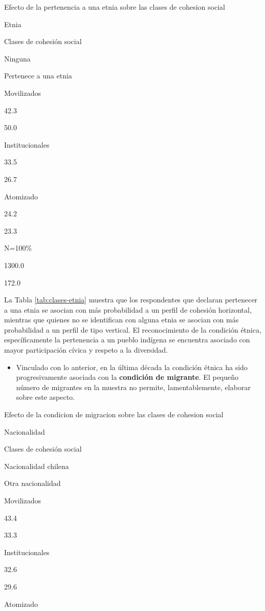 \documentclass[
  12pt,
]{book}
\providecommand{\tightlist}{%
  \setlength{\itemsep}{0pt}\setlength{\parskip}{0pt}}
\begin{document}
\label{tab:clases-etnia}Efecto de la pertenencia a una etnia sobre las clases de cohesion social

Etnia

Clases de cohesión social

Ninguna

Pertenece a una etnia

Movilizados

42.3

50.0

Institucionales

33.5

26.7

Atomizado

24.2

23.3

N=100\%

1300.0

172.0

La Tabla \ref{tab:clases-etnia} muestra que los respondentes que declaran pertenecer a una etnia se asocian con más probabilidad a un perfil de cohesión horizontal, mientras que quienes no se identifican con alguna etnia se asocian con más probabilidad a un perfil de tipo vertical. El reconocimiento de la condición étnica, específicamente la pertenencia a un pueblo indígena se encuentra asociado con mayor participación cívica y respeto a la diversidad.

\begin{itemize}
\tightlist
\item
  Vinculado con lo anterior, en la última década la condición étnica ha sido progresivamente asociada con la \textbf{condición de migrante}. El pequeño número de migrantes en la muestra no permite, lamentablemente, elaborar sobre este aspecto.
\end{itemize}

\label{tab:clases-nacion}Efecto de la condicion de migracion sobre las clases de cohesion social

Nacionalidad

Clases de cohesión social

Nacionalidad chilena

Otra nacionalidad

Movilizados

43.4

33.3

Institucionales

32.6

29.6

Atomizado
\end{document}
